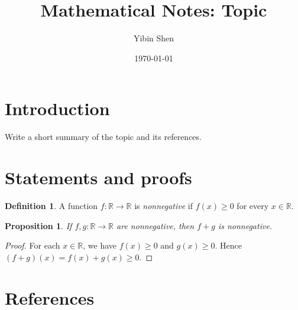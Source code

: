\documentclass[11pt,a4paper]{article}
\title{Mathematical Notes: Topic}
\author{Yibin Shen}
\date{\today}
\newtheorem{proposition}[theorem]{Proposition}
\theoremstyle{definition}
\newtheorem{definition}[theorem]{Definition}
\theoremstyle{remark}
\newcommand{\R}{\mathbb{R}}
\begin{document}
\maketitle

\section{Introduction}

Write a short summary of the topic and its references.

\section{Statements and proofs}

\begin{definition}
A function $f:\R\to\R$ is \emph{nonnegative} if
$f(x)\geq 0$ for every $x\in\R$.
\end{definition}

\begin{proposition}
If $f,g:\R\to\R$ are nonnegative, then $f+g$ is nonnegative.
\end{proposition}

\begin{proof}
For each $x\in\R$, we have $f(x)\geq 0$ and $g(x)\geq 0$.
Hence $(f+g)(x)=f(x)+g(x)\geq 0$.
\end{proof}

\section*{References}
\end{document}
